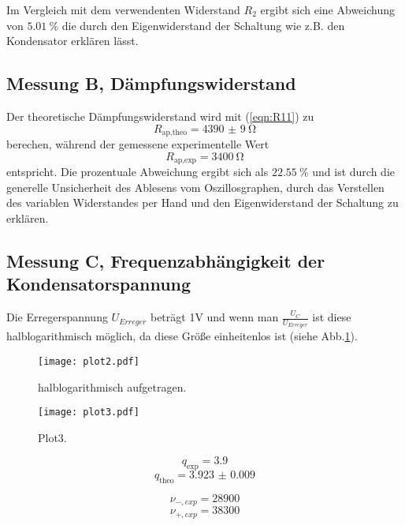 Im Vergleich mit dem verwendenten Widerstand $R_{\text{2}}$ ergibt sich eine Abweichung
von $\SI{5.01}{\percent}$ die durch den Eigenwiderstand der Schaltung wie z.B. den Kondensator
erklären lässt.

\subsection{Messung B, Dämpfungswiderstand}
Der theoretische Dämpfungswiderstand wird mit (\ref{eqn:R11}) zu
\begin{equation}
  R_{\text{ap,theo}} = \SI{4390(9)}{\ohm}
  \end{equation}
  berechen, während der gemessene experimentelle Wert
\begin{equation}
  R_{\text{ap,exp}} = \SI{3400}{\ohm}
\end{equation}
entspricht.
Die prozentuale Abweichung ergibt sich als $\SI{22.55}{\percent}$ und ist durch
die generelle Unsicherheit des Ablesens vom Oszillosgraphen, durch das Verstellen
des variablen Widerstandes per Hand und den Eigenwiderstand der Schaltung  zu erklären.

\subsection{Messung C, Frequenzabhängigkeit der Kondensatorspannung}

Die Erregerspannung $U_{Erreger}$ beträgt 1V und wenn man $\frac{U_{C}}{U_{Erreger}}$
ist diese halblogarithmisch möglich, da diese Größe einheitenlos ist (siehe Abb.\ref{fig:plot2}).

\begin{figure}
  \centering
  \texttt{[image: plot2.pdf]}
  \caption{halblogarithmisch aufgetragen.}
  \label{fig:plot2}
\end{figure}

\begin{figure}
  \centering
  \texttt{[image: plot3.pdf]}
  \caption{Plot3.}
  \label{fig:plot3}
\end{figure}

\begin{equation}
  q_{\text{exp}} = 3.9
\end{equation}
\begin{equation}
  q_{\text{theo}} = \num{3.923(9)}
\end{equation}

\begin{equation}
  \nu_{-,exp} = 28900
\end{equation}
\begin{equation}
  \nu_{+,exp} = 38300
\end{equation}

